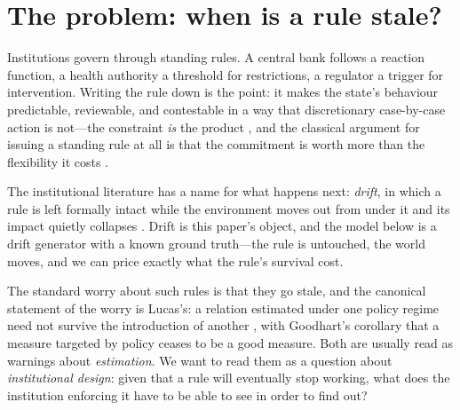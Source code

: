 \documentclass[11pt]{article}
\begin{document}
\begin{abstract}
Two design implications follow, and both are specific. Auditing whether a rule was followed cannot
reveal that the rule has stopped working; only evaluating what the rule achieved can, so institutions
built to detect non-compliance are, in a precise and measurable sense, blind to instrument failure.
And the paralysis institutional memory induces is a property of \emph{how the record is searched},
not of having one: given an equivalent record of a comparable authority's decisions, retrieved and
presented identically, our polity revises nearly ten times as often, pays none of the penalty, and is
the only configuration we measured that revises \emph{more} once the instrument breaks. The
difference is that a body searching its own file for the most similar past case finds something very
close to what it did last time, and does it again.
\end{abstract}

\section{The problem: when is a rule stale?}

Institutions govern through standing rules. A central bank follows a reaction function, a health
authority a threshold for restrictions, a regulator a trigger for intervention. Writing the rule
down is the point: it makes the state's behaviour predictable, reviewable, and contestable in a way
that discretionary case-by-case action is not---the constraint \emph{is} the product
\citep{north1990institutions}, and the classical argument for issuing a standing rule at all is that
the commitment is worth more than the flexibility it costs \citep{kydland1977rules}.

The institutional literature has a name for what happens next: \emph{drift}, in which a rule is left
formally intact while the environment moves out from under it and its impact quietly collapses
\citep{hacker2004privatizing,mahoney2010gradual}. Drift is this paper's object, and the model below is
a drift generator with a known ground truth---the rule is untouched, the world moves, and we can
price exactly what the rule's survival cost.

The standard worry about such rules is that they go stale, and the canonical statement of the worry
is Lucas's: a relation estimated under one policy regime need not survive the introduction of
another \citep{lucas1976critique}, with Goodhart's \citeyearpar{goodhart1984monetary} corollary that
a measure targeted by policy ceases to be a good measure. Both are usually read as warnings about
\emph{estimation}. We want to read them as a question about \emph{institutional design}: given that
a rule will eventually stop working, what does the institution enforcing it have to be able to see
in order to find out?
\end{document}
